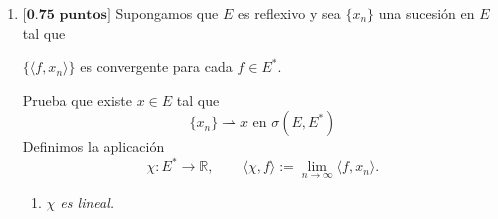 \documentclass[12pt]{article}
\begin{document}
\begin{ejercicio}
\begin{enumerate}[label=\alph*)]
\begin{enumerate}
            Por $(\ast)$, para todo $x\in E$ la sucesión $\{\langle f_n,x\rangle\}_{n\in\mathbb{N}}$ es convergente y, en particular, acotada:
            \[
            \sup_{n\in\mathbb{N}} |\langle f_n,x\rangle| < \infty
            \qquad \forall x\in E.
            \]
            Esto significa que la familia $\{f_n\}\subset E^\ast$ es puntualmente acotada.
            Por el teorema de Banach--Steinhaus(Acot. Unif.), existe $M>0$ tal que
            \[
            \sup_{n\in\mathbb{N}}\|f_n\|_{E^\ast} \le M.
            \]
            
            Entonces, para todo $x\in E$,
            \[
            |\langle f_n,x\rangle|
            \le \|f_n\|_{E^\ast}\,\|x\|
            \le M\|x\|,
            \]
            considerando el límite cuando $n\to\infty$ obtenemos
            \[
            |\langle f,x\rangle| \le M\|x\| \qquad \forall x\in E.
            \]
            Por tanto, $f$ es un funcional lineal continuo, es decir, $f\in E^\ast$.
            \end{enumerate}
            
            Además, por definición de $f$,
            \[
            \langle f_n,x\rangle \longrightarrow \langle f,x\rangle
            \qquad \forall x\in E,
            \]
            lo que, por la caracterización de la convergencia débil-$\ast$, implica que
            \[
            \{f_n\}\stackrel{\ast}{\rightharpoonup} f \text{\ en\ } \sigma(E^\ast,E)
            \]
            \newpage
                
            \item $\textbf{[0.75 puntos]}$ Supongamos que $E$ es reflexivo y sea $\{x_n\}$ una sucesión en $E$ tal que
                \begin{center}
                    $\{\langle f,x_n \rangle \}$ es convergente para cada $f\in E^\ast$.
                \end{center}
                Prueba que existe $x\in E$ tal que
                \begin{equation*}
                    \{x_n\}\rightharpoonup x \text{\ en\ } \sigma(E,E^\ast)
                \end{equation*}
            Definimos la aplicación
            \[
            \chi:E^\ast\longrightarrow \mathbb{R}, 
            \qquad 
            \langle \chi,f\rangle := \lim_{n\to\infty}\langle f,x_n\rangle .
            \]
            
            \begin{enumerate}
            \item \textit{$\chi$ es lineal.}
            

\end{enumerate}
\end{enumerate}
\end{ejercicio}
\end{document}
